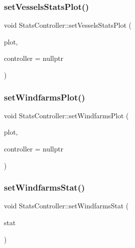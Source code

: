 \mbox{\label{class_stats_controller_a8f35f8b064453901f85d9ffb7b2c156d}} 
\subsubsection{\texorpdfstring{setVesselsStatsPlot()}{setVesselsStatsPlot()}}
{\footnotesize\ttfamily void Stats\+Controller\+::set\+Vessels\+Stats\+Plot (\begin{DoxyParamCaption}\item[{\mbox{\hyperlink{class_plot_widget}{Plot\+Widget}} $\ast$}]{plot,  }\item[{\mbox{\hyperlink{class_graph_interaction_controller}{Graph\+Interaction\+Controller}} $\ast$}]{controller = {\ttfamily nullptr} }\end{DoxyParamCaption})}

\mbox{\label{class_stats_controller_a5c770c9a993c28e83aea591974ab80dd}} 
\subsubsection{\texorpdfstring{setWindfarmsPlot()}{setWindfarmsPlot()}}
{\footnotesize\ttfamily void Stats\+Controller\+::set\+Windfarms\+Plot (\begin{DoxyParamCaption}\item[{\mbox{\hyperlink{class_plot_widget}{Plot\+Widget}} $\ast$}]{plot,  }\item[{\mbox{\hyperlink{class_graph_interaction_controller}{Graph\+Interaction\+Controller}} $\ast$}]{controller = {\ttfamily nullptr} }\end{DoxyParamCaption})}

\mbox{\label{class_stats_controller_a738e8fc35e5e9783406d4d02f3b39fc7}} 
\subsubsection{\texorpdfstring{setWindfarmsStat()}{setWindfarmsStat()}}
{\footnotesize\ttfamily void Stats\+Controller\+::set\+Windfarms\+Stat (\begin{DoxyParamCaption}\item[{\mbox{\hyperlink{namespacedisplace_1_1plot_a8b9bfd155809bb203b09c572304a62c3}{displace\+::plot\+::\+Windfarms\+Stat}}}]{stat }\end{DoxyParamCaption})}

